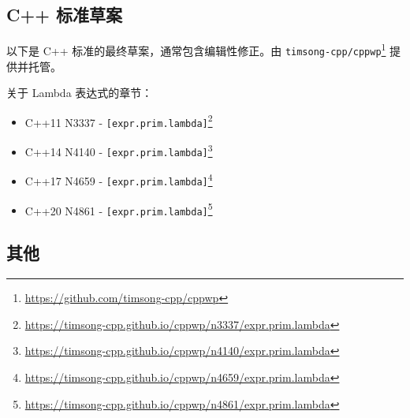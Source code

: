 
\subsection{C++ 标准草案}

以下是 C++ 标准的最终草案，通常包含编辑性修正。由 \texttt{timsong-cpp/cppwp}\footnote{\url{https://github.com/timsong-cpp/cppwp}} 提供并托管。

关于 Lambda 表达式的章节：

\begin{itemize}
\item C++11 N3337 - \texttt{[expr.prim.lambda]}\footnote{\url{https://timsong-cpp.github.io/cppwp/n3337/expr.prim.lambda}}
\item C++14 N4140 - \texttt{[expr.prim.lambda]}\footnote{\url{https://timsong-cpp.github.io/cppwp/n4140/expr.prim.lambda}}
\item C++17 N4659 - \texttt{[expr.prim.lambda]}\footnote{\url{https://timsong-cpp.github.io/cppwp/n4659/expr.prim.lambda}}
\item C++20 N4861 - \texttt{[expr.prim.lambda]}\footnote{\url{https://timsong-cpp.github.io/cppwp/n4861/expr.prim.lambda}}
\end{itemize}

\subsection{其他}

